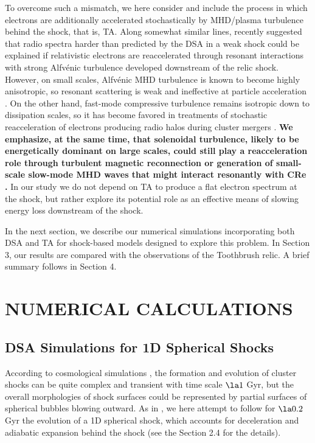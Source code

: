 \documentclass[twocolumn]{aastex61}
\begin{document}
To overcome such a mismatch, we
here consider and include the process in which electrons are additionally accelerated stochastically by MHD/plasma turbulence
behind the shock, that is, TA.
Along somewhat similar lines, \citet{fujita2015} recently suggested that radio spectra harder than predicted by the DSA in a weak shock
could be explained if relativistic electrons are reaccelerated through resonant interactions with strong Alfv\'enic turbulence
developed downstream of the relic shock.
However, on small scales, Alfv\'enic MHD turbulence is known to become highly anisotropic, so resonant scattering is weak and ineffective at particle acceleration \citep[e.g.,][]{brunetti2007}. On the other hand, fast-mode compressive turbulence remains isotropic down to dissipation scales, 
so it has become favored in treatments of stochastic reacceleration of electrons 
producing radio halos during cluster mergers \citep{brunetti2007,brunetti2011}.
{\bf We emphasize, at the same time, that solenoidal turbulence, likely to be energetically dominant on large scales, could still play a reacceleration role through turbulent magnetic reconnection \citep[e.g.,][]{brunetti2016} or generation of small-scale slow-mode MHD waves that might interact resonantly with CRe \citep[e.g.,][]{lynn2014}.} In our study we do not depend on TA
to produce a flat electron spectrum at the shock, but rather explore its potential role as an effective means of slowing energy loss downstream of the shock.

In the next section, we describe our numerical simulations incorporating both DSA and 
TA for shock-based models designed to explore this problem.
In Section 3, our results are compared with the observations of the Toothbrush relic.
A brief summary follows in Section 4.

\section{NUMERICAL CALCULATIONS}
 
\subsection{DSA Simulations for 1D Spherical Shocks}

According to cosmological simulations \citep[e.g.,][]{ryu03,vazza09,hong14}, the formation and evolution of cluster shocks can be quite 
complex and transient with time scale $\la 1$ Gyr, but the overall morphologies of shock surfaces could be represented by 
partial surfaces of spherical bubbles blowing outward.
As in \citet{kangryu15}, we here attempt to follow for $\la 0.2$ Gyr the evolution of a 1D spherical shock, which accounts for 
deceleration and adiabatic expansion behind the shock (see the Section 2.4 for the details).
\end{document}
